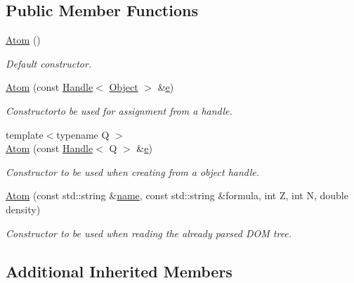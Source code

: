 \subsection*{Public Member Functions}
\begin{DoxyCompactItemize}
\item 
\hyperlink{class_d_d4hep_1_1_geometry_1_1_atom_ac4b6668ca1e8fc3b021642f398f74d03}{Atom} ()
\begin{DoxyCompactList}\small\item\em Default constructor. \end{DoxyCompactList}\item 
\hyperlink{class_d_d4hep_1_1_geometry_1_1_atom_a60bf5f87d457ce7d265149f6a13c4c0f}{Atom} (const \hyperlink{class_d_d4hep_1_1_handle}{Handle}$<$ \hyperlink{class_d_d4hep_1_1_geometry_1_1_atom_a9fdd9fe52048018b3cba23bc9fb855fd}{Object} $>$ \&\hyperlink{_volumes_8cpp_a8a9a1f93e9b09afccaec215310e64142}{e})
\begin{DoxyCompactList}\small\item\em Constructorto be used for assignment from a handle. \end{DoxyCompactList}\item 
{\footnotesize template$<$typename Q $>$ }\\\hyperlink{class_d_d4hep_1_1_geometry_1_1_atom_aa4000a63b8005e2ea5db6f38bbf95064}{Atom} (const \hyperlink{class_d_d4hep_1_1_handle}{Handle}$<$ Q $>$ \&\hyperlink{_volumes_8cpp_a8a9a1f93e9b09afccaec215310e64142}{e})
\begin{DoxyCompactList}\small\item\em Constructor to be used when creating from a object handle. \end{DoxyCompactList}\item 
\hyperlink{class_d_d4hep_1_1_geometry_1_1_atom_a3aa765b836dee92a2cfab6dfce0164df}{Atom} (const std\+::string \&\hyperlink{class_d_d4hep_1_1_handle_a27c7d467a609ab32c133e1f3c7d85ef5}{name}, const std\+::string \&formula, int Z, int N, double density)
\begin{DoxyCompactList}\small\item\em Constructor to be used when reading the already parsed D\+OM tree. \end{DoxyCompactList}\end{DoxyCompactItemize}
\subsection*{Additional Inherited Members}


